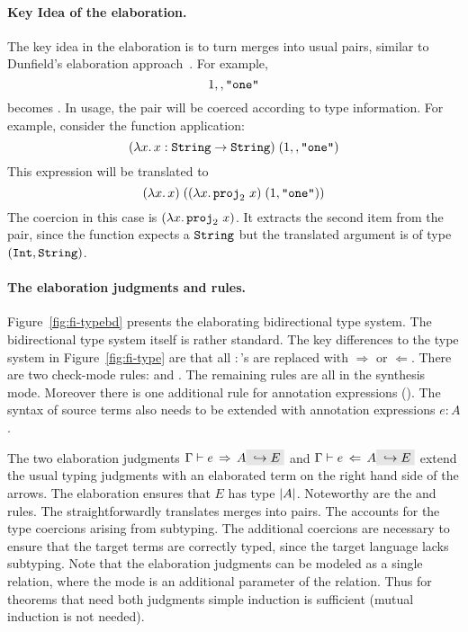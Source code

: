 \paragraph{Key Idea of the elaboration.}
The key idea in the elaboration is to turn merges into usual pairs, similar to Dunfield's
elaboration approach~\cite{dunfield2014elaborating}.
For example, \[ 1 \mergeop \code{"one"} \] becomes 
{}. In usage, the pair will be coerced according to type
information. For example, consider the function application: 
\[ \app {(\lamty x {\code{String}} x : \code{String} \to \code{String})} {(1 \mergeop \code{"one"})} \] 
This expression will be translated to \[ \app
{(\lamty x {\code{String}} x)} {(\app {(\lamty x {\pair {\code{Int}} {\code{String}}} {\proj 2~x})}
{\pair 1 {\code{"one"}}})} \] The coercion in this case is $(\lamty x {\pair
{\code{Int}} {\code{String}}} {\proj 2~x})$. It extracts the second item from the pair, since
the function expects a $\code{String}$ but the translated argument is of type $\pair
{\code{Int}} {\code{String}}$.

\paragraph{The elaboration judgments and rules.}
Figure~\ref{fig:fi-typebd} presents the elaborating bidirectional type
system. The bidirectional type system itself is rather standard.  The
key differences to the type system in Figure~\ref{fig:fi-type} are
that all $:$'s are replaced with $\Rightarrow$ or $\Leftarrow$. There
are two check-mode rules:  and
. The remaining rules are all in the synthesis
mode. Moreover there is one additional rule for annotation expressions
(). The syntax of source terms also needs to be
extended with annotation expressions $e : A$. 

The two elaboration judgments $\jinfer \Gamma e A \yields E$ and
$\jcheck \Gamma e A \yields E$ extend the usual typing judgments with
an elaborated term on the right hand side of the arrows. The
elaboration ensures that $E$ has type $\im A$.  Noteworthy are the
 and  rules. The
 straightforwardly translates merges into
pairs. The  accounts for the type coercions
arising from subtyping. The additional coercions are necessary to
ensure that the target terms are correctly typed, since the target
language lacks subtyping. Note that the elaboration judgments can be
modeled as a single relation, where the mode is an additional
parameter of the relation. Thus for theorems that need both judgments
simple induction is sufficient (mutual induction is not needed).


